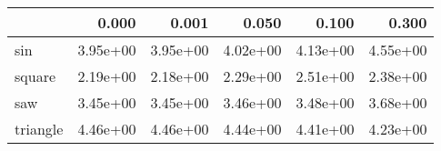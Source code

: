 \begin{tabular}{lrrrrr}
\toprule
{} &    0.000 &    0.001 &    0.050 &    0.100 &    0.300 \\
\midrule
sin      & 3.95e+00 & 3.95e+00 & 4.02e+00 & 4.13e+00 & 4.55e+00 \\
square   & 2.19e+00 & 2.18e+00 & 2.29e+00 & 2.51e+00 & 2.38e+00 \\
saw      & 3.45e+00 & 3.45e+00 & 3.46e+00 & 3.48e+00 & 3.68e+00 \\
triangle & 4.46e+00 & 4.46e+00 & 4.44e+00 & 4.41e+00 & 4.23e+00 \\
\bottomrule
\end{tabular}
